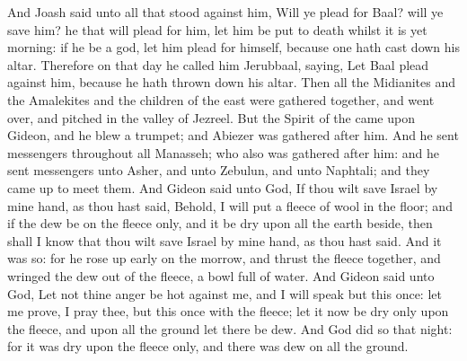 \begin{biblechapter}
\verse And Joash said unto all that stood against him, Will ye plead for Baal? will ye save him? he that will plead for him, let him be put to death whilst it is yet morning: if he be a god, let him plead for himself, because one hath cast down his altar.
\verse Therefore on that day he called him Jerubbaal, saying, Let Baal plead against him, because he hath thrown down his altar.
\verse Then all the Midianites and the Amalekites and the children of the east were gathered together, and went over, and pitched in the valley of Jezreel.
\verse But the Spirit of the \LORD came upon Gideon, and he blew a trumpet; and Abiezer was gathered after him.
\verse And he sent messengers throughout all Manasseh; who also was gathered after him: and he sent messengers unto Asher, and unto Zebulun, and unto Naphtali; and they came up to meet them.
\verse And Gideon said unto God, If thou wilt save Israel by mine hand, as thou hast said,
\verse Behold, I will put a fleece of wool in the floor; and if the dew be on the fleece only, and it be dry upon all the earth beside, then shall I know that thou wilt save Israel by mine hand, as thou hast said.
\verse And it was so: for he rose up early on the morrow, and thrust the fleece together, and wringed the dew out of the fleece, a bowl full of water.
\verse And Gideon said unto God, Let not thine anger be hot against me, and I will speak but this once: let me prove, I pray thee, but this once with the fleece; let it now be dry only upon the fleece, and upon all the ground let there be dew.
\verse And God did so that night: for it was dry upon the fleece only, and there was dew on all the ground.
\end{biblechapter}

